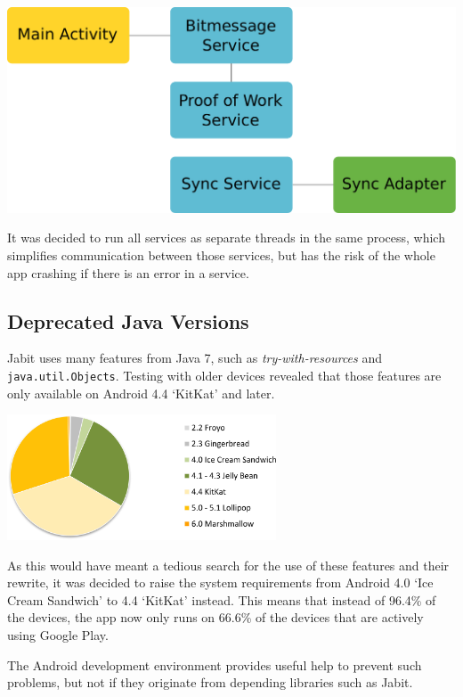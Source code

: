 \documentclass{bfh}
\begin{document}
  \begin{center}
    \includegraphics[width=0.8 \textwidth]{images/services.pdf}
  \end{center}

  It was decided to run all services as separate threads in the same process, which simplifies communication between those services, but has the risk of the whole app crashing if there is an error in a service.

  \subsection{Deprecated Java Versions}
  Jabit uses many features from Java 7, such as \textit{try-with-resources} and \texttt{java.util.Objects}. Testing with older devices revealed that those features are only available on Android 4.4 `KitKat' and later.

  \begin{center}
    \includegraphics[width=0.6\textwidth]{images/android_version_chart_dec_2015.png}
  \end{center}

  As this would have meant a tedious search for the use of these features and their rewrite, it was decided to raise the system requirements from Android 4.0 `Ice Cream Sandwich' to 4.4 `KitKat' instead. This means that instead of 96.4\% of the devices, the app now only runs on 66.6\% of the devices that are actively using Google Play\texttrademark{}.\cite{da:dashboards}

  The Android development environment provides useful help to prevent such problems, but not if they originate from depending libraries such as Jabit.
\end{document}
